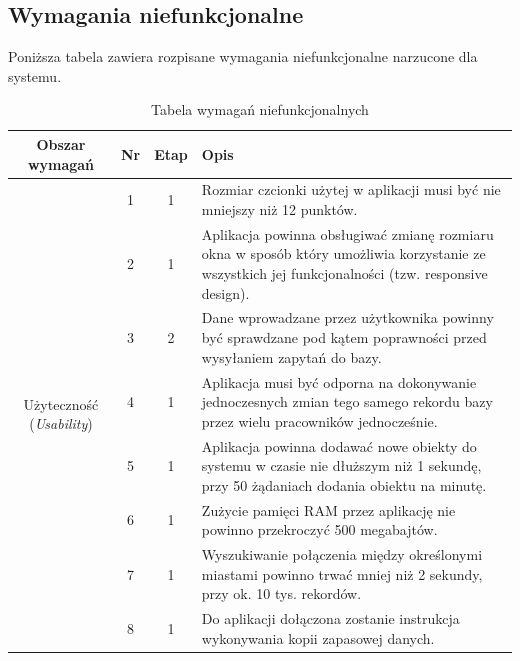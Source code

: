 \documentclass[10pt,a4paper]{article}
\begin{document}
\subsection{Wymagania niefunkcjonalne}
Poniższa tabela zawiera rozpisane wymagania niefunkcjonalne narzucone dla systemu.
\begin{table}[H]
	\begin{tabularx}{\textwidth}{|c|c|c|X|}
		\hline
		\textbf{Obszar wymagań} & \textbf{Nr} & \textbf{Etap} & \textbf{Opis} \\
		\hline
		\multirow{8}{*}{Użyteczność (\textit{Usability})}
		& 1 & 1 & Rozmiar czcionki użytej w aplikacji musi być nie mniejszy niż 12 punktów. \\
		\cline{2-4}
		& 2 & 1 & Aplikacja powinna obsługiwać zmianę rozmiaru okna w sposób który umożliwia korzystanie ze wszystkich jej funkcjonalności (tzw. responsive design). \\
		\cline{2-4}
		& 3 & 2 & Dane wprowadzane przez użytkownika powinny być sprawdzane pod kątem poprawności przed wysyłaniem zapytań do bazy. \\
		\hline
		\multirow{3}{*}{Niezawodność (\textit{Reliability})}
		& 4 & 1 & Aplikacja musi być odporna na dokonywanie jednoczesnych zmian tego samego rekordu bazy przez wielu pracowników jednocześnie. \\
		\hline
		\multirow{7}{*}{Wydajność (\textit{Performance})}
		& 5 & 1 & Aplikacja powinna dodawać nowe obiekty do systemu w czasie nie dłuższym niż 1 sekundę, przy 50 żądaniach dodania obiektu na minutę. \\
		\cline{2-4}
		& 6 & 1 & Zużycie pamięci RAM przez aplikację nie powinno przekroczyć 500 megabajtów. \\
		\cline{2-4}
		& 7 & 1 & Wyszukiwanie połączenia między określonymi miastami powinno trwać mniej niż 2 sekundy, przy ok. 10 tys. rekordów. \\
		\hline
		\multirow{2}{*}{Utrzymanie (\textit{Supportability})}
		& 8 & 1 & Do aplikacji dołączona zostanie instrukcja wykonywania kopii zapasowej danych. \\
		\hline
	\end{tabularx}
	\caption{Tabela wymagań niefunkcjonalnych}
\end{table}
\end{document}
